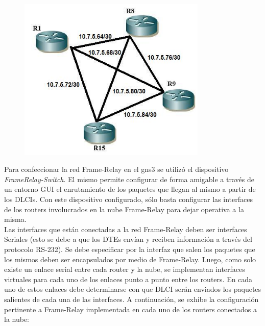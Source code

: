 			\begin{figure}[!htbp]
      	\centering
      	\begin{center}
      	\includegraphics[width=0.8\textwidth]{Imagenes/framerelay1.jpg}
      	\end{center}
      	\label{figFr001}
			\end{figure}

			Para confeccionar la red Frame-Relay en el gns3 se utilizó el dispositivo \textit{FrameRelay-Switch}. El mismo permite configurar de forma amigable
			a través de un entorno GUI el enrutamiento de los paquetes que llegan al mismo a partir de los DLCIs. Con este dispositivo configurado, 
			sólo basta configurar las interfaces de los routers involucrados en la nube Frame-Relay para dejar operativa a la misma. \\
			\indent  Las interfaces que están conectadas a la red Frame-Relay deben ser interfaces Seriales (esto se debe a que los DTEs envían y reciben información
			a través del protocolo RS-232). Se debe especificar por la interfaz que salen los paquetes que los mismos deben ser encapsulados por medio de Frame-Relay. 
			Luego, como solo existe un enlace serial entre cada router y la nube, se implementan interfaces virtuales para cada uno de los enlaces punto a punto entre
			los routers. En cada uno de estos enlaces debe determinarse con que DLCI serán enviados los paquetes salientes de cada una de las interfaces. 
			A continuación, se exhibe la configuración pertinente a Frame-Relay implementada en cada uno de los routers conectados a la nube: \\

